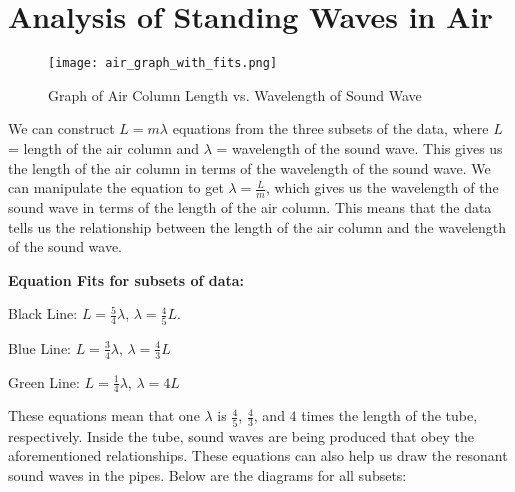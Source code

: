 \documentclass[11pt,twoside]{article}
\begin{document}

\section{Analysis of Standing Waves in Air}

\begin{figure}[H]
    \centering
    \texttt{[image: air\_graph\_with\_fits.png]}
    \caption{Graph of Air Column Length vs. Wavelength of Sound Wave}
\end{figure}
We can construct $L = m\lambda$ equations from the three subsets of the data, where $L$ = length of the air column and $\lambda$ = wavelength of the sound wave. This gives us the length of the air column in terms of the wavelength of the sound wave. We can manipulate the equation to get $\lambda = \frac{L}{m}$, which gives us the wavelength of the sound wave in terms of the length of the air column. This means that the data tells us the relationship between the length of the air column and the wavelength of the sound wave.
 
\textbf{Equation Fits for subsets of data:}

Black Line: $L =\frac{5}{4}\lambda$, $\lambda = \frac{4}{5}L$. 

Blue Line: $L =\frac{3}{4}\lambda$, $\lambda = \frac{4}{3}L$

Green Line: $L = \frac{1}{4}\lambda$, $\lambda = 4L$

These equations mean that one $\lambda$ is $\frac{4}{5}$, $\frac{4}{3}$, and $4$ times the length of the tube, respectively. Inside the tube, sound waves are being produced that obey the aforementioned relationships. These equations can also help us draw the resonant sound waves in the pipes. Below are the diagrams for all subsets:




\end{document}
